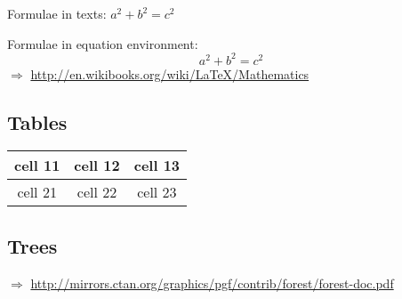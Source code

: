 Formulae in texts: $a^2 + b^2 = c^2$

\noindent Formulae in equation environment:
\begin{equation}
a^2 + b^2 = c^2
\end{equation}
$\Rightarrow$ \url{http://en.wikibooks.org/wiki/LaTeX/Mathematics}

\subsection{Tables}

\begin{tabular}{c|c|c}
\hline
cell 11 & cell 12 & cell 13 \\
\hline
cell 21 & cell 22 & cell 23 \\
\hline
\end{tabular}

\subsection{Trees}




\noindent $\Rightarrow$ \url{http://mirrors.ctan.org/graphics/pgf/contrib/forest/forest-doc.pdf}
